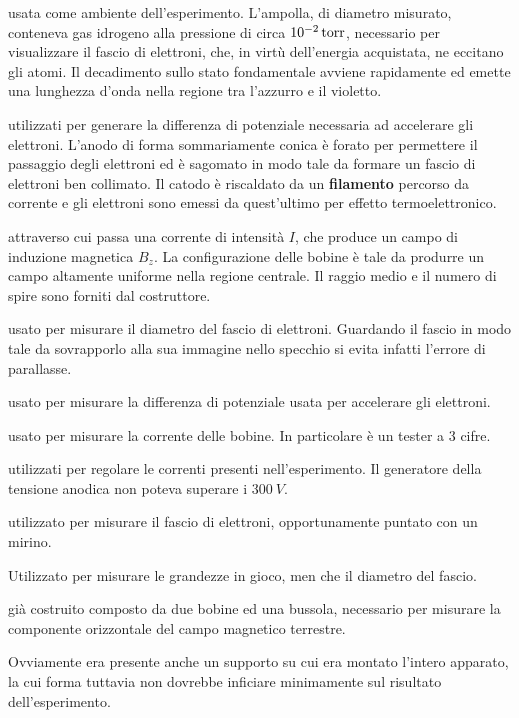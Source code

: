 \documentclass[a4paper,11pt]{article}
\begin{document}
		\begin{description}[align=left]
			
			\item [Ampolla di vetro] usata come ambiente dell'esperimento. L'ampolla, di diametro misurato, conteneva gas idrogeno alla pressione di circa $\SI{E-2}{torr}$, necessario per visualizzare il fascio di elettroni, che, in virtù dell'energia acquistata, ne eccitano gli atomi. Il decadimento sullo stato fondamentale avviene rapidamente ed emette una lunghezza d'onda nella regione tra l'azzurro e il violetto.
			
			\item [Due elettrodi] utilizzati per generare la differenza di potenziale necessaria ad accelerare gli elettroni. L'anodo di forma sommariamente conica è forato per permettere il passaggio degli elettroni ed è sagomato in modo tale da formare un fascio di elettroni ben collimato. Il catodo è riscaldato da un \textbf{filamento} percorso da corrente e gli elettroni sono emessi da quest'ultimo per effetto termoelettronico.
			
			\item [Due bobine di Helmholtz] attraverso cui passa una corrente di intensità $I$, che produce un campo di induzione magnetica $B _z$. La configurazione delle bobine è tale da produrre un campo altamente uniforme nella regione centrale. Il raggio medio e il numero di spire sono forniti dal costruttore.
			
			\item [Specchio] usato per misurare il diametro del fascio di elettroni. Guardando il fascio in modo tale da sovrapporlo alla sua immagine nello specchio si evita infatti l'errore di parallasse.
			
			\item [Un voltametro] usato per misurare la differenza di potenziale usata per accelerare gli elettroni.
			
			\item [Un amperometro] usato per misurare la corrente delle bobine. In particolare è un tester a 3 cifre.
			
			\item [Opportuni trasformatori] utilizzati per regolare le correnti presenti nell'esperimento. Il generatore della tensione anodica non poteva superare i $\SI{300}{V}$.
			
			\item [Calibro elettronico] utilizzato per misurare il fascio di elettroni, opportunamente puntato con un mirino.
			
			\item[Metro] Utilizzato per misurare le grandezze in gioco, men che il diametro del fascio.
			
			\item [Un apparato sperimentale] già costruito composto da due bobine ed una bussola, necessario per misurare la componente orizzontale del campo magnetico terrestre.
			
			Ovviamente era presente anche un supporto su cui era montato l'intero apparato, la cui forma tuttavia non dovrebbe inficiare minimamente sul risultato dell'esperimento.
			
		\end{description}
		
\end{document}
